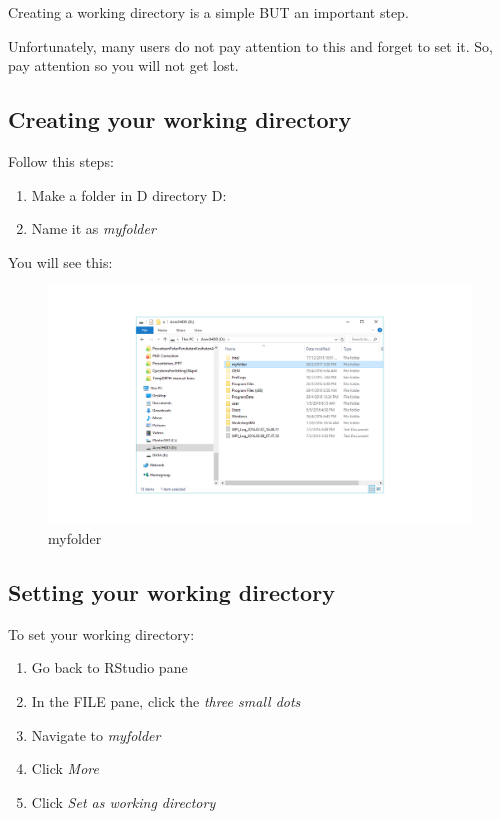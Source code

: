 \documentclass[]{book}
\providecommand{\tightlist}{%
  \setlength{\itemsep}{0pt}\setlength{\parskip}{0pt}}
\theoremstyle{definition}
\theoremstyle{definition}
\theoremstyle{remark}
\begin{document}
Creating a working directory is a simple BUT an important step.

Unfortunately, many users do not pay attention to this and forget to set
it. So, pay attention so you will not get lost.

\subsection{Creating your working
directory}\label{creating-your-working-directory}

Follow this steps:

\begin{enumerate}
\def\labelenumi{\arabic{enumi}.}
\tightlist
\item
  Make a folder in D directory D:\\
\item
  Name it as \emph{myfolder}
\end{enumerate}

You will see this:

\begin{figure}
\centering
\includegraphics{myfolder.png}
\caption{myfolder}
\end{figure}

\subsection{Setting your working
directory}\label{setting-your-working-directory}

To set your working directory:

\begin{enumerate}
\def\labelenumi{\arabic{enumi}.}
\tightlist
\item
  Go back to RStudio pane
\item
  In the FILE pane, click the \emph{three small dots}
\item
  Navigate to \emph{myfolder}
\item
  Click \emph{More}
\item
  Click \emph{Set as working directory}
\end{enumerate}
\end{document}
